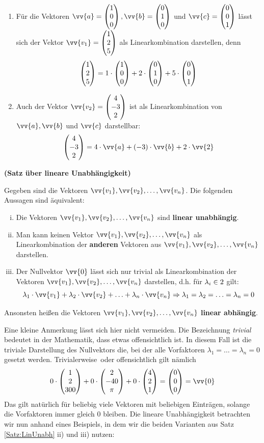 \documentclass[ngerman, 12pt]{nssheetxea}
\begin{document}
\begin{example} \
\begin{enumerate}
\item Für die Vektoren $\vv{a}=\colvec[1]{0}{0}, \vv{b}=\colvec[0]{1}{0}$ und $\vv{c}=\colvec[0]{0}{1}$ lässt sich der Vektor $\vv{v_1}=\colvec[1]{2}{5}$ als Linearkombination darstellen, denn
\[ \colvec[1]{2}{5} = 1\cdot \colvec[1]{0}{0} + 2\cdot \colvec[0]{1}{0} + 5 \cdot \colvec[0]{0}{1}\]
\item Auch der Vektor $\vv{v_2}=\colvec[4]{-3}{2}$ ist als Linearkombination von $\vv{a}, \vv{b}$ und $\vv{c}$ darstellbar:
\[ \colvec[4]{-3}{2} = 4 \cdot \vv{a} + (-3) \cdot \vv{b} + 2 \cdot \vv{2}  \]
\end{enumerate}
\label{Bsp:LinKomb}
\end{example}

\begin{theorem} \textbf{(Satz über lineare Unabhängigkeit)} \par
Gegeben sind die Vektoren $\vv{v_1}, \vv{v_2}, \ldots, \vv{v_n}$. Die folgenden Aussagen sind äquivalent:
\begin{enumerate}[i)]
\item Die Vektoren $\vv{v_1}, \vv{v_2}, \ldots, \vv{v_n}$ sind \textbf{linear unabhängig}. 
\item Man kann keinen Vektor $\vv{v_1}, \vv{v_2}, \ldots, \vv{v_n}$ als Linearkombination der \textbf{anderen} Vektoren aus $\vv{v_1}, \vv{v_2}, \ldots, \vv{v_n}$ darstellen.
\item Der Nullvektor $\vv{0}$ lässt sich nur trivial als Linearkombination der Vektoren $\vv{v_1}, \vv{v_2}, \ldots, \vv{v_n}$ darstellen, d.h. für $\lambda_i \in 2$ gilt:
\[ \lambda_1 \cdot \vv{v_1} + \lambda_2 \cdot \vv{v_2} + \ldots + \lambda_n \cdot \vv{v_n} \Rightarrow \lambda_1 = \lambda_2 = \ldots = \lambda_n=0  \]
\end{enumerate}
\label{Satz:LinUnabh}
Ansonsten heißen die Vektoren $\vv{v_1}, \vv{v_2}, \ldots, \vv{v_n}$ \textbf{linear abhängig}.
\end{theorem}

Eine kleine Anmerkung lässt sich hier nicht vermeiden. Die Bezeichnung \emph{trivial} bedeutet in der Mathematik, dass etwas offensichtlich ist. In diesem Fall ist die triviale Darstellung des Nullvektors die, bei der alle Vorfaktoren $\lambda_1 = \ldots = \lambda_n=0$ gesetzt werden. \glqq Trivialerweise\grqq \ oder offensichtlich gilt nämlich
\[ 0\cdot \colvec[1]{2}{300} + 0 \cdot \colvec[2]{-40}{\pi} + 0 \cdot \colvec[4]{2}{1} = \colvec[0]{0}{0} = \vv{0}\]
Das gilt natürlich für beliebig viele Vektoren mit beliebigen Einträgen, solange die Vorfaktoren immer gleich $0$ bleiben. Die lineare Unabhängigkeit betrachten wir nun anhand eines Beispiels, in dem wir die beiden Varianten aus Satz \ref{Satz:LinUnabh} ii) und iii) nutzen:
\end{document}
